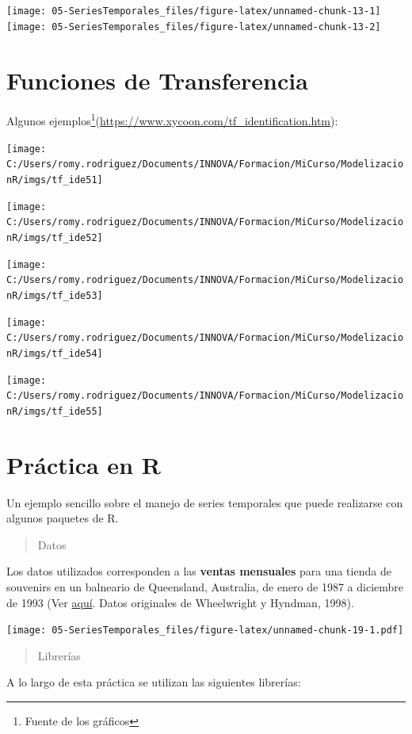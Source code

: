 \documentclass[]{book}
\let\rmarkdownfootnote\footnote%
\def\footnote{\protect\rmarkdownfootnote}
\begin{document}
\texttt{[image: 05-SeriesTemporales\_files/figure-latex/unnamed-chunk-13-1]}
\texttt{[image: 05-SeriesTemporales\_files/figure-latex/unnamed-chunk-13-2]}

\hypertarget{funciones-de-transferencia}{%
\section{Funciones de Transferencia}\label{funciones-de-transferencia}}

Algunos ejemplos\footnote{Fuente de los gráficos}(\url{https://www.xycoon.com/tf_identification.htm}):

\texttt{[image: C:/Users/romy.rodriguez/Documents/INNOVA/Formacion/MiCurso/ModelizacionR/imgs/tf\_ide51]}

\texttt{[image: C:/Users/romy.rodriguez/Documents/INNOVA/Formacion/MiCurso/ModelizacionR/imgs/tf\_ide52]}

\texttt{[image: C:/Users/romy.rodriguez/Documents/INNOVA/Formacion/MiCurso/ModelizacionR/imgs/tf\_ide53]}

\texttt{[image: C:/Users/romy.rodriguez/Documents/INNOVA/Formacion/MiCurso/ModelizacionR/imgs/tf\_ide54]}

\texttt{[image: C:/Users/romy.rodriguez/Documents/INNOVA/Formacion/MiCurso/ModelizacionR/imgs/tf\_ide55]}

\hypertarget{practica-en-r-3}{%
\section{Práctica en R}\label{practica-en-r-3}}

Un ejemplo sencillo sobre el manejo de series temporales que puede realizarse con algunos paquetes de R.

\begin{quote}
Datos
\end{quote}

Los datos utilizados corresponden a las \textbf{ventas mensuales} para una tienda de souvenirs en un balneario de Queensland, Australia, de enero de 1987 a diciembre de 1993 (Ver \href{http://robjhyndman.com/tsdldata/data/fancy.dat}{aquí}. Datos originales de Wheelwright y Hyndman, 1998).

\texttt{[image: 05-SeriesTemporales\_files/figure-latex/unnamed-chunk-19-1.pdf]}

\begin{quote}
Librerías
\end{quote}

A lo largo de esta práctica se utilizan las siguientes librerías:
\end{document}
